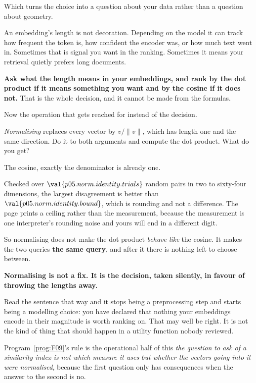 \begin{fr}
Which turns the choice into a question about your data rather than a question
about geometry.

An embedding's length is not decoration. Depending on the model it can track
how frequent the token is, how confident the encoder was, or how much text went
in. Sometimes that is signal you want in the ranking. Sometimes it means your
retrieval quietly prefers long documents.

\textbf{Ask what the length means in your embeddings, and rank by the dot
product if it means something you want and by the cosine if it does not.} That
is the whole decision, and it cannot be made from the formulas.
\end{fr}

\begin{fr}
Now the operation that gets reached for instead of the decision.

\emph{Normalising} replaces every vector by $v / \lVert v \rVert$, which has
length one and the same direction. Do it to both arguments and compute the dot
product. What do you get?
\nextframe
\end{fr}

\begin{fr}
\begin{ansblock}
The cosine, exactly \dash{} the denominator is already one.
\end{ansblock}

Checked over $\val{p05.norm.identity.trials}$ random pairs in two to sixty-four
dimensions, the largest disagreement is better than
$\val{p05.norm.identity.bound}$, which is rounding and not a difference. The
page prints a ceiling rather than the measurement, because the measurement is
one interpreter's rounding noise and yours will end in a different digit.

So normalising does not make the dot product \emph{behave like} the cosine. It
makes the two queries \textbf{the same query}, and after it there is nothing
left to choose between.
\end{fr}

\begin{fr}
\begin{trapbox}
\textbf{Normalising is not a fix. It is the decision, taken silently, in favour
of throwing the lengths away.}

Read the sentence that way and it stops being a preprocessing step and starts
being a modelling choice: you have declared that nothing your embeddings encode
in their magnitude is worth ranking on. That may well be right. It is not the
kind of thing that should happen in a utility function nobody reviewed.

Program~\ref{prog:F09}'s rule is the operational half of this \dash{} \emph{the
question to ask of a similarity index is not which measure it uses but whether
the vectors going into it were normalised}, because the first question only has
consequences when the answer to the second is no.
\end{trapbox}
\end{fr}

